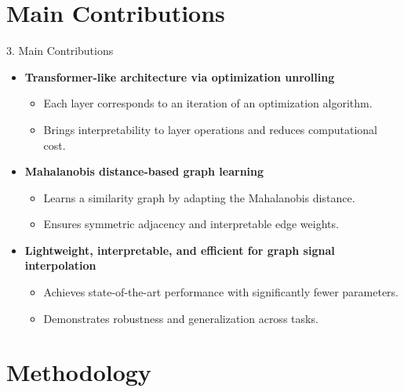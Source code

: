 \documentclass[aspectratio=169,xcolor=dvipsnames]{beamer}
\begin{document}
\section{Main Contributions}

\begin{frame}{3. Main Contributions}
    \begin{itemize}
        \item \textbf{Transformer-like architecture via optimization unrolling}
        \begin{itemize}
            \item Each layer corresponds to an iteration of an optimization algorithm.
            \item Brings interpretability to layer operations and reduces computational cost.
        \end{itemize}

        \vspace{0.3cm}

        \item \textbf{Mahalanobis distance-based graph learning}
        \begin{itemize}
            \item Learns a similarity graph by adapting the Mahalanobis distance. \cite{hu2020feature}
            \item Ensures symmetric adjacency and interpretable edge weights.
        \end{itemize}

        \vspace{0.3cm}

        \item \textbf{Lightweight, interpretable, and efficient for graph signal interpolation}
        \begin{itemize}
            \item Achieves state-of-the-art performance with significantly fewer parameters.
            \item Demonstrates robustness and generalization across tasks.
        \end{itemize}
    \end{itemize}
\end{frame}
\section{Methodology}
\end{document}
